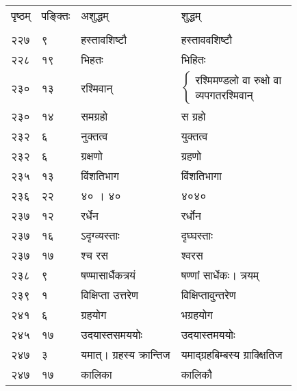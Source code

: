 \documentclass[11pt, openany]{book}
\begin{document}
\newpage

\begin{longtable}{p{1cm} p{1.5cm} p{4.5cm} p{4.5cm}}

पृष्ठम् & पङ्क्तिः &  अशुद्धम् & शुद्धम्\\
\vspace{2mm}\\

 २२७ & ९ & हस्तावशिष्टौ & हस्ताववशिष्टौ \\

 २२८ & १९ & भिहतः & भिहितः \\

 २३० & १३ & रश्मिवान् & $\begin{cases}\mbox{रश्मिमण्डलो वा रुक्षो वा}\\
\mbox{व्यपगतरश्मिवान् }\end{cases}$\\

 २३० & १४ & समग्रहो & स ग्रहो \\

 २३२ & ६ & नुक्तत्व & युक्तत्व \\

 २३२ & ६ & ग्रक्षणो & ग्रहणो \\

 २३५ & १३ & विंशतिभाग & विंशतिभागा \\

 २३६ & २२ & ४० । ४० & ४०४० \\

 २३७ & १२ & रर्धेन & रर्धोन \\

 २३७ & १६ & ऽदृग्व्यस्ताः & दृघ्घस्ताः \\

 २३७ & १७ & श्च रस & श्वरस \\

 २३८ & ९ & षण्मासार्धैकत्रयं & षण्णां सार्धेकः। त्रयम् \\

 २३९ & १ & विक्षिप्ता उत्तरेण & विक्षिप्तावुन्तरेण \\

 २४१ & ६ & ग्रहयोग & भग्रहयोग \\

 २४५ & १७ & उदयास्तसमययोः & उदयास्तमययोः \\

 २४७ & ३ & यमात्। ग्रहस्य क्रान्तिज & यमाद्ग्रहबिम्बस्य ग्राक्क्षितिज \\

 २४७ & १७ & कालिका & कालिकौ \\


\end{longtable}
\end{document}
